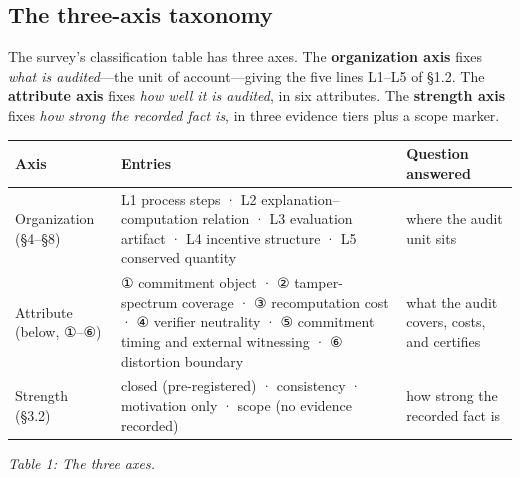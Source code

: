\documentclass[11pt]{article}
\begin{document}
\subsection{The three-axis taxonomy}
\noindent The survey's classification table has three axes. The \textbf{organization axis} fixes \emph{what is audited}—the unit of account—giving the five lines L1–L5 of §1.2. The \textbf{attribute axis} fixes \emph{how well it is audited}, in six attributes. The \textbf{strength axis} fixes \emph{how strong the recorded fact is}, in three evidence tiers plus a scope marker.\par
\begingroup\small
\noindent\begin{tabularx}{\textwidth}{@{}>{\raggedright\arraybackslash}p{} >{\raggedright\arraybackslash}X >{\raggedright\arraybackslash}p{}@{}}
\toprule
\textbf{\textbf{Axis}} & \textbf{\textbf{Entries}} & \textbf{\textbf{Question answered}} \\
\midrule
Organization (§4–§8) & L1 process steps · L2 explanation–computation relation · L3 evaluation artifact · L4 incentive structure · L5 conserved quantity & where the audit unit sits \\
Attribute (below, ①–⑥) & ① commitment object · ② tamper-spectrum coverage · ③ recomputation cost · ④ verifier neutrality · ⑤ commitment timing and external witnessing · ⑥ distortion boundary & what the audit covers, costs, and certifies \\
Strength (§3.2) & closed (pre-registered) · consistency · motivation only · scope (no evidence recorded) & how strong the recorded fact is \\
\bottomrule
\end{tabularx}
\endgroup
\begin{center}\emph{Table 1: The three axes.}\end{center}
\begingroup\small
\end{document}
